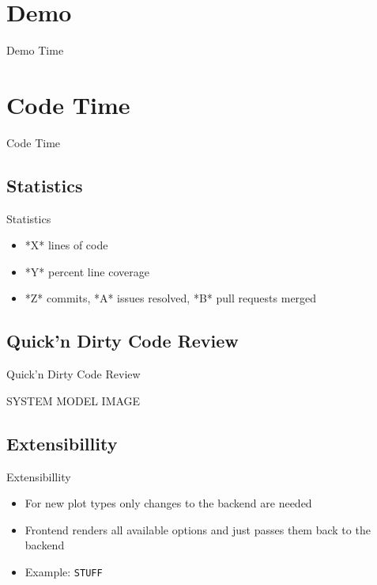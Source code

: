 \documentclass{beamer}
\begin{document}
\section{Demo}
\begin{frame}
  \begin{center}
    \Huge{Demo Time}
  \end{center}
\end{frame}

\section{Code Time}
\begin{frame}
  \begin{center}
    \Huge{Code Time}
  \end{center}
\end{frame}

\subsection{Statistics}
\begin{frame}{Statistics}
  \begin{itemize}
      \item *X* lines of code
      \item *Y* percent line coverage
      \item *Z* commits, *A* issues resolved, *B* pull requests merged
  \end{itemize}
\end{frame}

\subsection{Quick'n Dirty Code Review}
\begin{frame}{Quick'n Dirty Code Review}
  \begin{center}
    \large{SYSTEM MODEL IMAGE}
  \end{center}
\end{frame}

\subsection{Extensibillity}
\begin{frame}{Extensibillity}
  \begin{itemize}
    \item For new plot types only changes to the backend are needed
    \item Frontend renders all available options and just passes them back to the backend
    \item Example: \texttt{STUFF}
  \end{itemize}
\end{frame}
\end{document}
